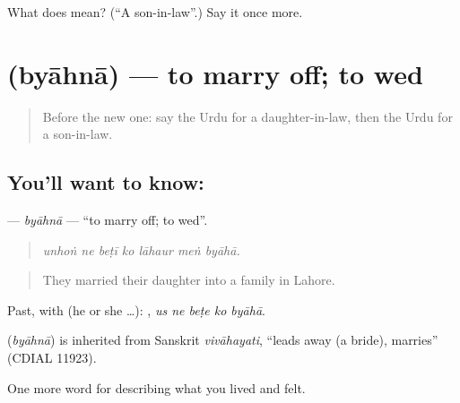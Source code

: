 \begin{tcolorbox}[breakable,colback=teal!4,colframe=teal!35!black,title={Before you move on}]
What does  mean? (\textquotedblleft{}A son-in-law\textquotedblright{}.) Say it once more.
\end{tcolorbox}
\section[\texorpdfstring{\ur{بیاہنا} (byāhnā)}{بیاہنا (byāhnā)}]{ (byāhnā) — to marry off; to wed}

\label{lesson:UR-C488-byahna}



\begin{quote}
Before the new one: say the Urdu for a daughter-in-law, then the Urdu for a son-in-law.
\end{quote}

\subsection*{You'll want to know: }
\textbf{} — \emph{byāhnā} — \textquotedblleft{}to marry off; to wed\textquotedblright{}.

\begin{quote}
      
\end{quote}

\begin{quote}
\emph{unhoṅ ne beṭī ko lāhaur meṅ byāhā.}
\end{quote}

\begin{quote}
They married their daughter into a family in Lahore.
\end{quote}

Past, with  (he or she …):     , \emph{us ne beṭe ko byāhā}.

\begin{cousinweb}
\textbf{} (\emph{byāhnā}) is inherited from Sanskrit \emph{vivāhayati}, \textquotedblleft{}leads away (a bride), marries\textquotedblright{} (CDIAL 11923).
\end{cousinweb}

\begin{grammarlens}[title={What you've built}]
One more word for describing what you lived and felt.
\end{grammarlens}

